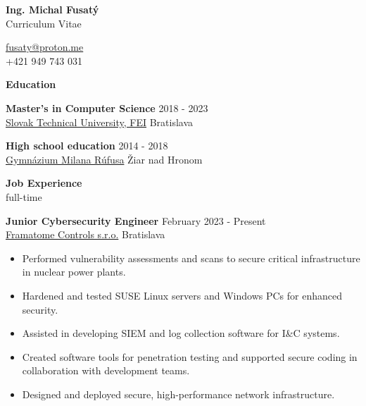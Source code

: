 \documentclass[12pt]{article}
\begin{document}
\begingroup
{}
\begin{center}
	{\Large \bfseries Ing. Michal Fusatý} \\
	{\large Curriculum Vitae} 	
\end{center}
\endgroup


\begin{center}
	\noindent
	\href{mailto:fusaty@proton.me}{fusaty@proton.me} \\[0.04in]    
	+421 949 743 031 \\
\end{center}
	\noindent

\begin{center}
	{\noindent \bfseries Education}
\end{center} 

\noindent
{\bfseries Master's in Computer Science} \hfill 2018 - 2023\\[0.04in] 
\noindent \href{https://www.fei.stuba.sk/english.html?page_id=793}{Slovak Technical University, FEI} \hfill Bratislava
\noindent

\vspace{0.1in}

\noindent
{\bfseries High school education} \hfill 2014 - 2018\\ 
\noindent \href{https://gymziar.edupage.org/}{Gymnázium Milana Rúfusa}  \hfill Žiar nad Hronom
\noindent


\vspace{0.2in} %

\begin{center}
	{\noindent \bfseries Job Experience} \\
	{full-time}
\end{center}

\noindent
{\bfseries Junior Cybersecurity Engineer} \hfill February 2023 - Present \\[0.04in]  
\noindent \href{https://www.framatome.com/en/about/}{Framatome Controls s.r.o.} \hfill Bratislava
\begin{itemize} \itemsep -2pt %
\item Performed vulnerability assessments and scans to secure critical infrastructure in nuclear power plants.
\item Hardened and tested SUSE Linux servers and Windows PCs for enhanced security.
\item Assisted in developing SIEM and log collection software for I\&C systems.
\item Created software tools for penetration testing and supported secure coding in collaboration with development teams.
\item Designed and deployed secure, high-performance network infrastructure.
\end{itemize}
\end{document}
